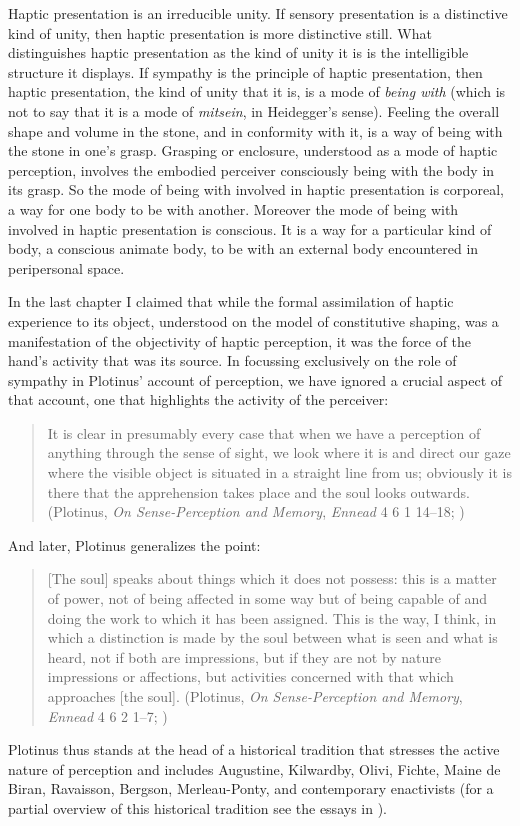Haptic presentation is an irreducible unity. If sensory presentation is a distinctive kind of unity, then haptic presentation is more distinctive still. What distinguishes haptic presentation as the kind of unity it is is the intelligible structure it displays. If sympathy is the principle of haptic presentation, then haptic presentation, the kind of unity that it is, is a mode of \emph{being with} (which is not to say that it is a mode of \emph{mitsein}, in Heidegger's sense). Feeling the overall shape and volume in the stone, and in conformity with it, is a way of being with the stone in one's grasp. Grasping or enclosure, understood as a mode of haptic perception, involves the embodied perceiver consciously being with the body in its grasp. So the mode of being with involved in haptic presentation is corporeal, a way for one body to be with another. Moreover the mode of being with involved in haptic presentation is conscious. It is a way for a particular kind of body, a conscious animate body, to be with an external body encountered in peripersonal space.

In the last chapter I claimed that while the formal assimilation of haptic experience to its object, understood on the model of constitutive shaping, was a manifestation of the objectivity of haptic perception, it was the force of the hand's activity that was its source. In focussing exclusively on the role of sympathy in Plotinus' account of perception, we have ignored a crucial aspect of that account, one that highlights the activity of the perceiver:
\begin{quote}
	It is clear in presumably every case that when we have a perception of anything through the sense of sight, we look where it is and direct our gaze where the visible object is situated in a straight line from us; obviously it is there that the apprehension takes place and the soul looks outwards. (Plotinus, \emph{On Sense-Perception and Memory}, \emph{Ennead} 4 6 1 14--18; \citealt[321]{Armstrong:1984aa})
\end{quote}
And later, Plotinus generalizes the point:
\begin{quote}
	[The soul] speaks about things which it does not possess: this is a matter of power, not of being affected in some way but of being capable of and doing the work to which it has been assigned. This is the way, I think, in which a distinction is made by the soul between what is seen and what is heard, not if both are impressions, but if they are not by nature impressions or affections, but activities concerned with that which approaches [the soul]. (Plotinus, \emph{On Sense-Perception and Memory}, \emph{Ennead} 4 6 2 1--7; \citealt[325]{Armstrong:1984aa})
\end{quote}
Plotinus thus stands at the head of a historical tradition that stresses the active nature of perception and includes Augustine, Kilwardby, Olivi, Fichte, Maine de Biran, Ravaisson, Bergson, Merleau-Ponty, and contemporary enactivists (for a partial overview of this historical tradition see the essays in \citealt{Silva:2014cl}). 


